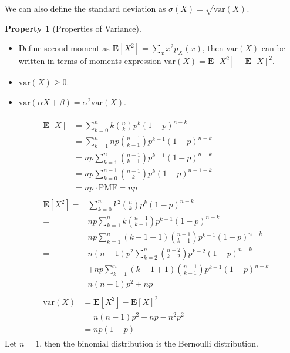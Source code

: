 \documentclass[device=normal, lang=en, fontsize=12pt]{elegantnote}
\numberwithin{equation}{section}
\theoremstyle{definition} %
\newtheorem{property}{Property}[section] %
\begin{document}
We can also define the standard deviation as $\sigma(X) = \sqrt{\mathrm{var}(X)}$.
\begin{property}[Properties of Variance] ~ 
    \begin{itemize}
        \item Define second moment as $\mathbf{E}[X^2] = \sum_x x^2 p_{X}(x)$, then $\mathrm{var}(X)$ can be written in terms of moments expression $\mathrm{var}(X) = \mathbf{E}[X^{2}] - \mathbf{E}[X]^{2}$.
        \item $\mathrm{var}(X) \geq 0$.
        \item $\mathrm{var}(\alpha X + \beta) = \alpha^{2} \mathrm{var}(X)$.
    \end{itemize}
\end{property}
\begin{example}
    \begin{align}
    &\begin{aligned}
        \mathbf{E}[X] &= \sum_{k=0}^{n} k \binom{n}{k} p^{k} (1-p)^{n-k} \\
                      &= \sum_{k=1}^{n} np \binom{n-1}{k-1} p^{k-1} (1-p)^{n-k} \\
                      &= np \sum_{k=1}^{n} \binom{n-1}{k-1} p^{k-1} (1-p)^{n-k} \\
                      &= np \sum_{k=0}^{n-1} \binom{n-1}{k} p^{k} (1-p)^{n-1-k} \\
                      &= np \cdot \mathrm{PMF} = np
    \end{aligned} \\
    &\begin{aligned}
        \mathbf{E}[X^{2}] =& \sum_{k=0}^{n} k^{2} \binom{n}{k} p^{k} (1-p)^{n-k} \\
                         =& np \sum_{k=1}^{n} k \binom{n-1}{k-1} p^{k-1} (1-p)^{n-k} \\
                         =& np \sum_{k=1}^{n} (k-1+1) \binom{n-1}{k-1} p^{k-1} (1-p)^{n-k} \\ 
                         =& n(n-1)p^2 \sum_{k=2}^{n} \binom{n-2}{k-2} p^{k-2} (1-p)^{n-k} \\ 
                         &+ np \sum_{k=1}^{n} (k-1+1) \binom{n-1}{k-1} p^{k-1} (1-p)^{n-k} \\ 
                         =& n(n-1)p^2 + np
    \end{aligned} \\
    &\begin{aligned}
        \mathrm{var}(X) &= \mathbf{E}[X^{2}] - \mathbf{E}[X]^{2} \\
                        &= n(n-1)p^2 + np - n^2p^2 \\
                        &= np(1-p)
    \end{aligned}
    \end{align}
    Let $n = 1$, then the binomial distribution is the Bernoulli distribution.
\end{example}
\end{document}
